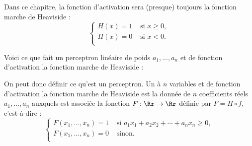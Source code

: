 \documentclass[11pt,class=report,crop=false]{standalone}
\begin{document}
Dans ce chapitre, la fonction d'activation sera (presque) toujours la fonction marche de Heaviside :
$$\begin{cases}
H(x) = 1 & \text{ si } x \ge 0, \\
H(x) = 0  & \text{ si } x < 0. \\
\end{cases}$$




Voici ce que fait un perceptron linéaire de poids $a_1,\ldots,a_n$ et de fonction d'activation la fonction marche de Heaviside :



On peut donc définir ce qu'est un perceptron. Un  à $n$ variables et de fonction d'activation la fonction marche de Heaviside est la donnée de $n$ coefficients réels $a_1,\ldots,a_n$ auxquels est associée la fonction $F : \Rr \to \Rr$ définie par $F = H \circ f$, c'est-à-dire :
$$\begin{cases}
F(x_1,\ldots,x_n) = 1 & \text{ si } a_1 x_1 + a_2 x_2 + \cdots + a_n x_n \ge 0, \\
F(x_1,\ldots,x_n) = 0  & \text{ sinon.} \\
\end{cases}$$
\end{document}
